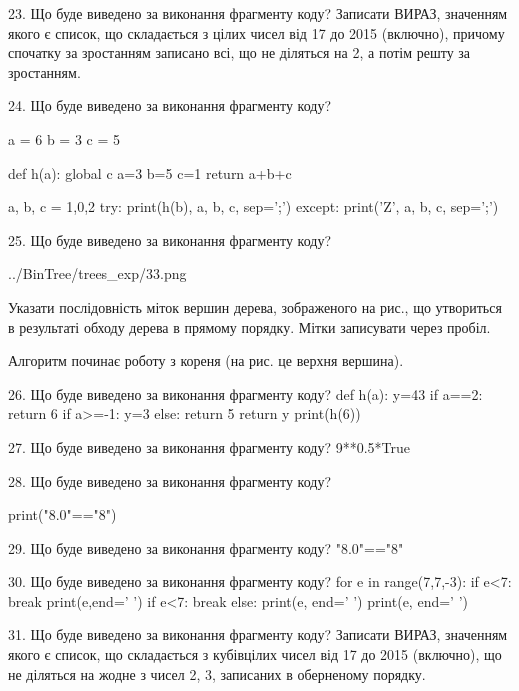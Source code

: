 \documentclass[11pt]{article}
\begin{document}

23. Що буде виведено за виконання фрагменту коду?
Записати ВИРАЗ, значенням якого є список, що складається з цілих чисел від 17 до 2015 (включно), причому спочатку за зростанням записано всі, що не діляться на 2, а потім решту за зростанням.


24. Що буде виведено за виконання фрагменту коду?

a = 6
b = 3
c = 5

def h(a):
global c    a=3
    b=5
    c=1
    return a+b+c

a, b, c = 1,0,2
try:
    print(h(b), a, b, c, sep=';')
except:
    print('Z', a, b, c, sep=';')


25. Що буде виведено за виконання фрагменту коду?

\begin{center}
	{../BinTree/trees_exp/33.png}
\end{center}
Указати послідовність міток вершин дерева, зображеного на рис., що утвориться в результаті обходу дерева в прямому порядку. Мітки записувати через пробіл.\par Алгоритм починає роботу з кореня (на рис. це верхня вершина).


26. Що буде виведено за виконання фрагменту коду?
def h(a):
      y=43
      if a==2: return 6
      if a>=-1: y=3
      else: return 5
      return y
   print(h(6))

27. Що буде виведено за виконання фрагменту коду?
9**0.5*True

28. Що буде виведено за виконання фрагменту коду?

print("8.0"=="8")


29. Що буде виведено за виконання фрагменту коду?
"8.0"=="8"

30. Що буде виведено за виконання фрагменту коду?
for e in range(7,7,-3):
    if e<7:
        break
        print(e,end=' ')
    if e<7:
        break
else:
    print(e, end=' ')
print(e, end=' ')


31. Що буде виведено за виконання фрагменту коду?
Записати ВИРАЗ, значенням якого є список, що складається з кубівцілих чисел від 17 до 2015 (включно), що не діляться на жодне з чисел 2, 3, записаних в обернено\-му порядку.
\end{document}
